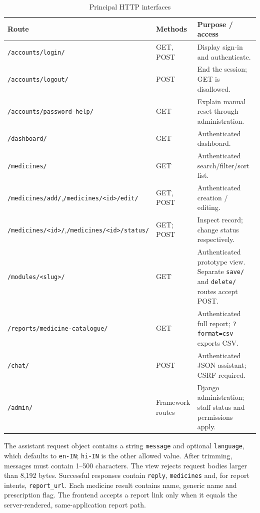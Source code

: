 \documentclass{article}
\begin{document}
\begin{table}[H]
\centering\small
\caption{Principal HTTP interfaces}
\begin{tabularx}{\textwidth}{L{53mm}L{24mm}Y}
\toprule Route & Methods & Purpose / access\\\midrule
\texttt{/accounts/login/} & GET, POST & Display sign-in and authenticate.\\
\texttt{/accounts/logout/} & POST & End the session; GET is disallowed.\\
\texttt{/accounts/password-help/} & GET & Explain manual reset through administration.\\
\texttt{/dashboard/} & GET & Authenticated dashboard.\\
\texttt{/medicines/} & GET & Authenticated search/filter/sort list.\\
\texttt{/medicines/add/},\newline\texttt{/medicines/<id>/edit/} & GET, POST & Authenticated creation / editing.\\
\texttt{/medicines/<id>/},\newline\texttt{/medicines/<id>/status/} & GET; POST & Inspect record; change status respectively.\\
\texttt{/modules/<slug>/} & GET & Authenticated prototype view. Separate \texttt{save/} and \texttt{delete/} routes accept POST.\\
\texttt{/reports/medicine-catalogue/} & GET & Authenticated full report; \texttt{?format=csv} exports CSV.\\
\texttt{/chat/} & POST & Authenticated JSON assistant; CSRF required.\\
\texttt{/admin/} & Framework routes & Django administration; staff status and permissions apply.\\
\bottomrule
\end{tabularx}
\end{table}

The assistant request object contains a string \texttt{message} and optional \texttt{language}, which defaults to \texttt{en-IN}; \texttt{hi-IN} is the other allowed value. After trimming, messages must contain 1--500 characters. The view rejects request bodies larger than 8,192 bytes. Successful responses contain \texttt{reply}, \texttt{medicines} and, for report intents, \texttt{report\_url}. Each medicine result contains name, generic name and prescription flag. The frontend accepts a report link only when it equals the server-rendered, same-application report path.
\end{document}
